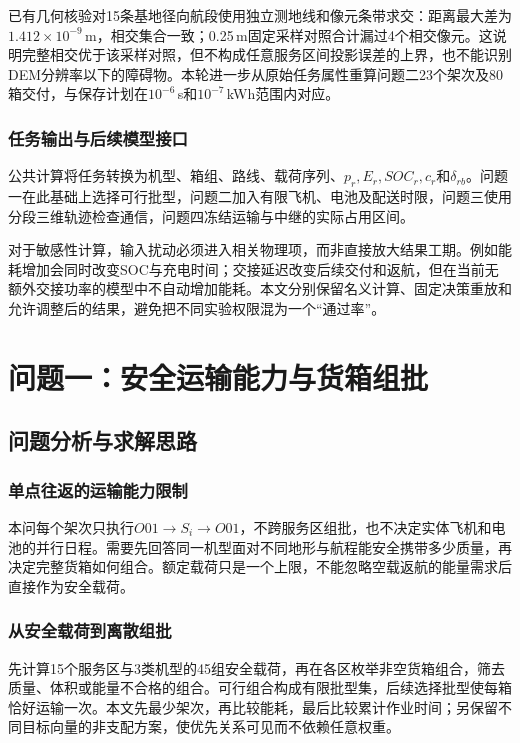 \documentclass[withoutpreface,colorprint]{format}
\numberwithin{equation}{section}
\numberwithin{figure}{section}
\numberwithin{table}{section}
\begin{document}
已有几何核验对15条基地径向航段使用独立测地线和像元条带求交：距离最大差为$1.412\times10^{-9}$\,m，相交集合一致；0.25\,m固定采样对照合计漏过4个相交像元。这说明完整相交优于该采样对照，但不构成任意服务区间投影误差的上界，也不能识别DEM分辨率以下的障碍物。本轮进一步从原始任务属性重算问题二23个架次及80箱交付，与保存计划在$10^{-6}$\,s和$10^{-7}$\,kWh范围内对应。

\subsubsection{任务输出与后续模型接口}
公共计算将任务转换为机型、箱组、路线、载荷序列、$p_r,E_r,SOC_r,c_r$和$\delta_{rb}$。问题一在此基础上选择可行批型，问题二加入有限飞机、电池及配送时限，问题三使用分段三维轨迹检查通信，问题四冻结运输与中继的实际占用区间。

对于敏感性计算，输入扰动必须进入相关物理项，而非直接放大结果工期。例如能耗增加会同时改变SOC与充电时间；交接延迟改变后续交付和返航，但在当前无额外交接功率的模型中不自动增加能耗。本文分别保留名义计算、固定决策重放和允许调整后的结果，避免把不同实验权限混为一个“通过率”。


\section{问题一：安全运输能力与货箱组批}
\label{sec:q1}

\subsection{问题分析与求解思路}
\subsubsection{单点往返的运输能力限制}
本问每个架次只执行$O01\to S_i\to O01$，不跨服务区组批，也不决定实体飞机和电池的并行日程。需要先回答同一机型面对不同地形与航程能安全携带多少质量，再决定完整货箱如何组合。额定载荷只是一个上限，不能忽略空载返航的能量需求后直接作为安全载荷。

\subsubsection{从安全载荷到离散组批}
先计算15个服务区与3类机型的45组安全载荷，再在各区枚举非空货箱组合，筛去质量、体积或能量不合格的组合。可行组合构成有限批型集，后续选择批型使每箱恰好运输一次。本文先最少架次，再比较能耗，最后比较累计作业时间；另保留不同目标向量的非支配方案，使优先关系可见而不依赖任意权重。
\end{document}
